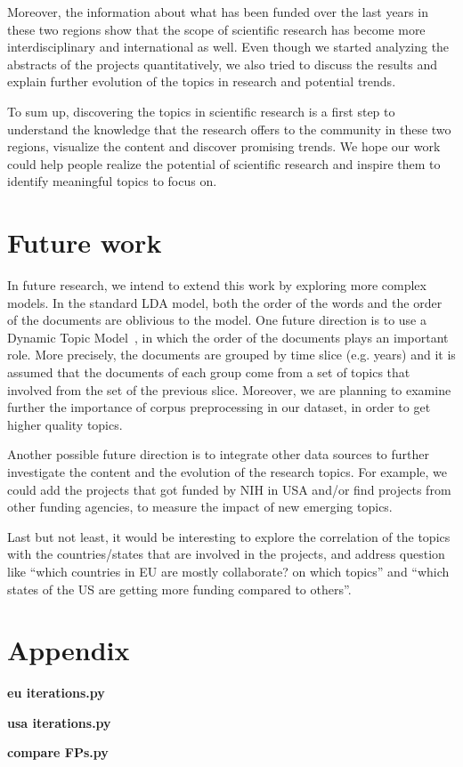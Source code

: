 \documentclass[12pt]{report}
\begin{document}
Moreover, the information about what has been funded over the last years in
these two regions show that the scope of scientific research has become more
interdisciplinary and international as well. Even though we started analyzing
the abstracts of the projects quantitatively, we also tried to discuss the
results and explain further evolution of the topics in research and potential
trends.

To sum up, discovering the topics in scientific research is a first step to
understand the knowledge that the research offers to the community in these two
regions, visualize the content and discover promising trends. We hope our work
could help people realize the potential of scientific research and inspire them
to identify meaningful topics to focus on.

\section{Future work}
\label{future}
In future research, we intend to extend this work by exploring more complex
models. In the standard LDA model, both the order of the words and the order of
the documents are oblivious to the model. One future direction is to use a
Dynamic Topic Model~\cite{Blei:2006:DTM:1143844.1143859}, in which the order of
the documents plays an important role. More precisely, the documents are grouped
by time slice (e.g. years) and it is assumed that the documents of each group
come from a set of topics that involved from the set of the previous slice.
Moreover, we are planning to examine further the importance of corpus
preprocessing in our dataset, in order to get higher quality topics.

Another possible future direction is to integrate other data sources to further
investigate the content and the evolution of the research topics. For example,
we could add the projects that got funded by NIH in USA and/or find projects
from other funding agencies, to measure the impact of new emerging topics.

Last but not least, it would be interesting to explore the correlation
of the topics with the countries/states that are involved in the
projects, and address question like ``which countries in EU are mostly
collaborate? on which topics'' and ``which states of the US are getting
more funding compared to others''.

{}


\clearpage
\section{Appendix}

\textbf{eu iterations.py}



\textbf{usa iterations.py}



\textbf{compare FPs.py}


\end{document}
